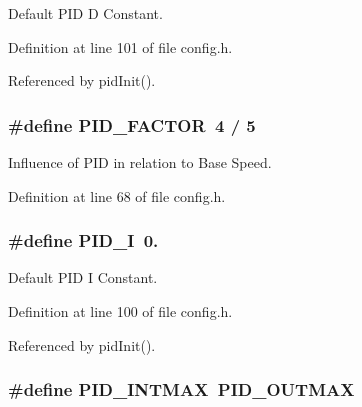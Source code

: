 Default P\-I\-D D Constant. 



Definition at line 101 of file config.\-h.



Referenced by pid\-Init().

\hypertarget{group__config_ga0eb032986beceb6759aebd761c35a879}{
\subsubsection[{P\-I\-D\-\_\-\-F\-A\-C\-T\-O\-R}]{\setlength{\rightskip}{0pt plus 5cm}\#define P\-I\-D\-\_\-\-F\-A\-C\-T\-O\-R~4 / 5}}\label{group__config_ga0eb032986beceb6759aebd761c35a879}


Influence of P\-I\-D in relation to Base Speed. 



Definition at line 68 of file config.\-h.

\hypertarget{group__config_ga2dfd5fcf8dd0bee1de9007fe8e161886}{
\subsubsection[{P\-I\-D\-\_\-\-I}]{\setlength{\rightskip}{0pt plus 5cm}\#define P\-I\-D\-\_\-\-I~0.}}\label{group__config_ga2dfd5fcf8dd0bee1de9007fe8e161886}


Default P\-I\-D I Constant. 



Definition at line 100 of file config.\-h.



Referenced by pid\-Init().

\hypertarget{group__config_ga50582411cbb3f8a20ffd3aa2254ddf71}{
\subsubsection[{P\-I\-D\-\_\-\-I\-N\-T\-M\-A\-X}]{\setlength{\rightskip}{0pt plus 5cm}\#define P\-I\-D\-\_\-\-I\-N\-T\-M\-A\-X~{\bf P\-I\-D\-\_\-\-O\-U\-T\-M\-A\-X}}}\label{group__config_ga50582411cbb3f8a20ffd3aa2254ddf71}


